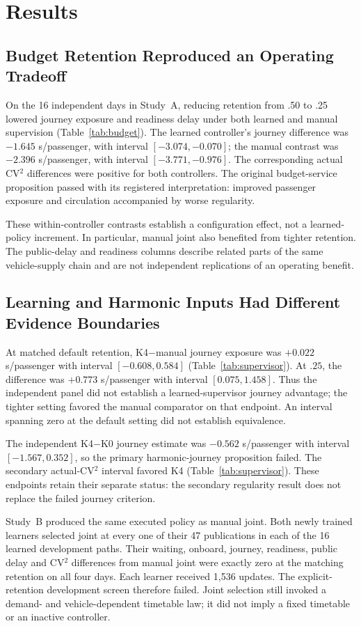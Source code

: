 \section{Results}
\subsection{Budget Retention Reproduced an Operating Tradeoff}

On the 16 independent days in Study~A, reducing retention from .50 to .25 lowered journey exposure and readiness delay under both learned and manual supervision (Table~\ref{tab:budget}). The learned controller's journey difference was $-1.645$ s/passenger, with interval $[-3.074,-0.070]$; the manual contrast was $-2.396$ s/passenger, with interval $[-3.771,-0.976]$. The corresponding actual CV$^2$ differences were positive for both controllers. The original budget-service proposition passed with its registered interpretation: improved passenger exposure and circulation accompanied by worse regularity.

These within-controller contrasts establish a configuration effect, not a learned-policy increment. In particular, manual joint also benefited from tighter retention. The public-delay and readiness columns describe related parts of the same vehicle-supply chain and are not independent replications of an operating benefit.

\subsection{Learning and Harmonic Inputs Had Different Evidence Boundaries}

At matched default retention, K4$-$manual journey exposure was $+0.022$ s/passenger with interval $[-0.608,0.584]$ (Table~\ref{tab:supervisor}). At $.25$, the difference was $+0.773$ s/passenger with interval $[0.075,1.458]$. Thus the independent panel did not establish a learned-supervisor journey advantage; the tighter setting favored the manual comparator on that endpoint. An interval spanning zero at the default setting did not establish equivalence.

The independent K4$-$K0 journey estimate was $-0.562$ s/passenger with interval $[-1.567,0.352]$, so the primary harmonic-journey proposition failed. The secondary actual-CV$^2$ interval favored K4 (Table~\ref{tab:supervisor}). These endpoints retain their separate status: the secondary regularity result does not replace the failed journey criterion.

Study~B produced the same executed policy as manual joint. Both newly trained learners selected joint at every one of their 47 publications in each of the 16 learned development paths. Their waiting, onboard, journey, readiness, public delay and CV$^2$ differences from manual joint were exactly zero at the matching retention on all four days. Each learner received 1,536 updates. The explicit-retention development screen therefore failed. Joint selection still invoked a demand- and vehicle-dependent timetable law; it did not imply a fixed timetable or an inactive controller.

